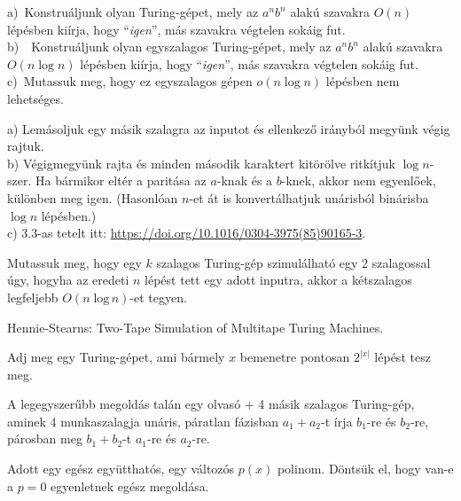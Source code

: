 \begin{Exercise}[counter={sorszam}, difficulty=0]	
	a)~Konstruáljunk olyan Turing-gépet, mely az $a^nb^n$ alak\'u
	szavakra $O(n)$ l\'ep\'esben ki\'irja, hogy ``{\it igen}'',
	m\'as szavakra v\'egtelen sok\'aig fut.\\
	b)~~Konstruáljunk olyan egyszalagos Turing-gépet, mely az $a^nb^n$ alak\'u
	szavakra $O(n \log n)$ l\'ep\'esben ki\'irja, hogy ``{\it igen}'',
	m\'as szavakra v\'egtelen sok\'aig fut.\\
	c)~\hard Mutassuk meg, hogy ez egyszalagos gépen $o(n\log n)$ l\'ep\'esben nem lehets\'eges.
\end{Exercise}	 
\begin{Answer}
	a) Lem\'asoljuk egy m\'asik szalagra az inputot \'es ellenkez\H o ir\'anyb\'ol megy\"unk v\'egig rajtuk.\\
	b) V\'egigmegy\"unk rajta \'es minden m\'asodik karaktert kit\"or\"olve ritk\'itjuk $\log n$-szer. Ha b\'armikor elt\'er a parit\'asa az $a$-knak \'es a $b$-knek, akkor nem egyenl\H oek, k\"ul\"onben meg igen.
	(Hasonl\'oan $n$-et \'at is konvert\'alhatjuk un\'arisb\'ol bin\'arisba $\log n$ l\'ep\'esben.)\\
	c) 3.3-as tetelt itt: \url{https://doi.org/10.1016/0304-3975(85)90165-3}.
\end{Answer}

\begin{Exercise}[counter={sorszam}, difficulty=1]
	Mutassuk meg, hogy egy $k$ szalagos Turing-gép szimulálható egy 2 szalagossal úgy, hogyha az eredeti $n$ lépést tett egy adott inputra, akkor a kétszalagos legfeljebb $O(n \mathrm{\;log\,} n)$-et tegyen.
\end{Exercise}	 
\begin{Answer}
	Hennie-Stearns: Two-Tape Simulation of Multitape Turing Machines.
\end{Answer}


\begin{Exercise}[counter={sorszam}, difficulty=0]
	Adj meg egy Turing-gépet, ami b\'armely $x$ bemenetre pontosan $2^{|x|}$ lépést tesz meg.
\end{Exercise}	 
\begin{Answer}
	A legegyszer\H ubb megold\'as tal\'an egy olvas\'o + 4 m\'asik szalagos Turing-g\'ep, aminek 4 munkaszalagja un\'aris, p\'aratlan f\'azisban $a_1+a_2$-t \'irja $b_1$-re \'es $b_2$-re, p\'arosban meg $b_1+b_2$-t $a_1$-re \'es $a_2$-re.
\end{Answer}

\begin{Exercise}[counter={sorszam}, difficulty=0]
	Adott egy egész együtthatós, egy változós $p(x)$ polinom. Döntsük el, hogy van-e a $p= 0$ egyenletnek egész megoldása.
\end{Exercise}	


